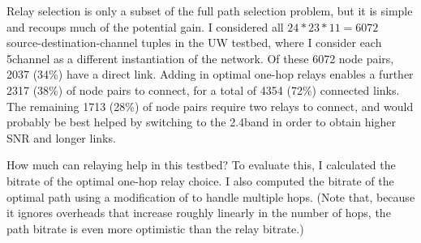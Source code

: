 Relay selection is only a subset of the full path selection problem, but it is simple and recoups much of the potential gain. I considered all $24*23*11=6072$ source-destination-channel tuples in the UW testbed, where I consider each 5\GHz channel as a different instantiation of the network. Of these 6072 node pairs, 2037 (34\%) have a direct link. Adding in optimal one-hop relays enables a further 2317 (38\%) of node pairs to connect, for a total of 4354 (72\%) connected links. The remaining 1713 (28\%) of node pairs require two relays to connect, and would probably be best helped by switching to the 2.4\GHz band in order to obtain higher SNR and longer links.

How much can relaying help in this testbed? To evaluate this, I calculated the bitrate of the optimal one-hop relay choice. I also computed the bitrate of the optimal path using a modification of  to handle multiple hops. (Note that, because it ignores overheads that increase roughly linearly in the number of hops, the path bitrate is even more optimistic than the relay bitrate.)

